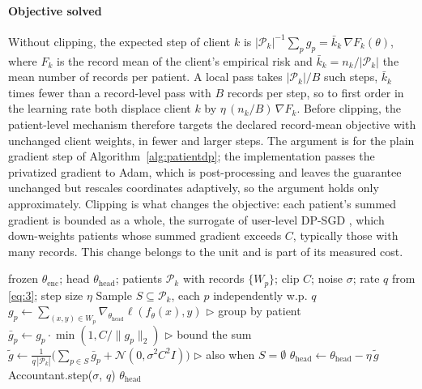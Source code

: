 \paragraph{Objective solved} Without clipping, the expected step of client
$k$ is $|\mathcal{P}_k|^{-1}\sum_{p}g_p = \bar{k}_k\,\nabla F_k(\theta)$,
where $F_k$ is the record mean of the client's empirical risk and
$\bar{k}_k = n_k/|\mathcal{P}_k|$ the mean number of records per patient. A
local pass takes $|\mathcal{P}_k|/B$ such steps, $\bar{k}_k$ times fewer
than a record-level pass with $B$ records per step, so to first order in the
learning rate both displace client $k$ by $\eta\,(n_k/B)\,\nabla F_k$.
Before clipping, the patient-level mechanism therefore targets the declared
record-mean objective with unchanged client weights, in fewer and larger
steps. The argument is for the plain gradient step of
Algorithm~\ref{alg:patientdp}; the implementation passes the privatized
gradient to Adam, which is post-processing and leaves the guarantee unchanged
but rescales coordinates adaptively, so the argument holds only approximately.
Clipping is what changes the objective: each patient's summed gradient
is bounded as a whole, the surrogate of user-level DP-SGD \cite{ref11}, which
down-weights patients whose summed gradient exceeds $C$, typically those with
many records. This change belongs to the unit and is part of its measured
cost.

\begin{algorithm}[!t]
\caption{Patient-level private local update at client $k$}
\label{alg:patientdp}
\begin{algorithmic}[1]
\REQUIRE frozen $\theta_{\mathrm{enc}}$; head $\theta_{\mathrm{head}}$;
         patients $\mathcal{P}_k$ with records $\{W_p\}$; clip $C$;
         noise $\sigma$; rate $q$ from \eqref{eq:3}; step size $\eta$
  \STATE Sample $S \subseteq \mathcal{P}_k$, each $p$ independently w.p. $q$
    \STATE $g_p \leftarrow \sum_{(x,y)\in W_p}
            \nabla_{\theta_{\mathrm{head}}} \ell(f_\theta(x),y)$
            \hfill $\triangleright$ group by patient
    \STATE $\bar g_p \leftarrow g_p \cdot \min(1, C/\lVert g_p\rVert_2)$
            \hfill $\triangleright$ bound the sum
  \ENDFOR
  \STATE $\tilde g \leftarrow \frac{1}{q\,|\mathcal{P}_k|}\big(\sum_{p\in S}\bar g_p
          + \mathcal{N}(0,\sigma^2C^2I)\big)$
          \hfill $\triangleright$ also when $S=\emptyset$
  \STATE $\theta_{\mathrm{head}} \leftarrow \theta_{\mathrm{head}} - \eta\,\tilde g$
  \STATE Accountant.step($\sigma$, $q$)
\ENDFOR
\RETURN $\theta_{\mathrm{head}}$
\end{algorithmic}
\end{algorithm}

